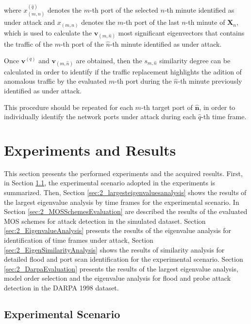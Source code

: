 where $x^{(\hat{q})}_{(m,\hat{n})}$ denotes the $m$-th port of the selected $n$-th minute identified as under attack and $x_{(m,n)}$ denotes the $m$-th port of the last $n$-th minute of $\boldsymbol{X}_n$, which is used to calculate the $\boldsymbol{v}_{(m,\hat{n})}$ most significant eigenvectors that contains the traffic of the $m$-th port of the $\hat{n}$-th minute identified as under attack.

Once $\boldsymbol{v}^{(q)}$ and $\boldsymbol{v}_{(m,\hat{n})}$ are obtained, then the $s_{m,\hat{n}}$ similarity degree can be calculated in order to identify if the traffic replacement highlights the adition of anomalous traffic by the evaluated $m$-th port during the $\hat{n}$-th minute previously identified as under attack. 

This procedure should be repeated for each $m$-th target port of $\boldsymbol{\hat{n}}$, in order to individually identify the network ports under attack during each $\hat{q}$-th time frame.


\section{Experiments and Results}
\label{sec:2_experimentalresults}

This section presents the performed experiments and the acquired results. First, in Section \ref{sec:2_AnalyzedScenario}, the experimental scenario adopted in the experiments is summarized. Then, Section \ref{sec:2_largesteigenvaluesanalysis} shows the results of the largest eigenvalue analysis by time frames for the experimental scenario. In Section \ref{sec:2_MOSSchemesEvaluation} are described the results of the evaluated MOS schemes for attack detection in the simulated dataset. Section \ref{sec:2_EigenvalueAnalysis} presents the results of the eigenvalue analysis for identification of time frames under attack, Section \ref{sec:2_EigenSimilarityAnalysis} shows the results of similarity analysis for detailed flood and port scan identification for the experimental scenario. Section \ref{sec:2_DarpaEvaluation} presents the results of the largest eigenvalue analysis, model order selection and the eigenvalue analysis for flood and probe attack detection in the DARPA 1998 dataset.

\subsection{Experimental Scenario}
\label{sec:2_AnalyzedScenario}


